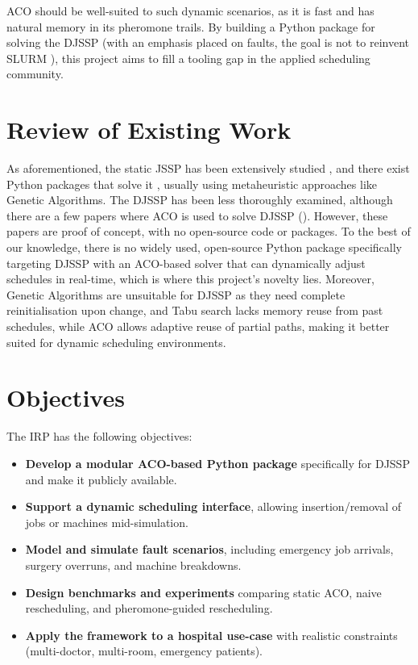 \documentclass[project-plan]{report-template}
\begin{document}
ACO should be well-suited to such dynamic scenarios, as it is fast and has natural memory in its pheromone trails. By building a Python package for solving the DJSSP (with an emphasis placed on faults, the goal is not to reinvent SLURM \cite{slurm}), this project aims to fill a tooling gap in the applied scheduling community.

\section{Review of Existing Work}
As aforementioned, the static JSSP has been extensively studied \cite{jssp}\cite{jssp-healthcare}\cite{jssp-manufacturing}, and there exist Python packages that solve it \cite{jobshoplib}, usually using metaheuristic approaches like Genetic Algorithms. The DJSSP has been less thoroughly examined, although there are a few papers where ACO is used to solve DJSSP (\cite{ELCOCK2023100280}\cite{acodjssp}). However, these papers are proof of concept, with no open-source code or packages.
To the best of our knowledge, there is no widely used, open-source Python package specifically targeting DJSSP with an ACO-based solver that can dynamically adjust schedules in real-time, which is where this project's novelty lies. Moreover, Genetic Algorithms are unsuitable for DJSSP as they need complete reinitialisation upon change, and Tabu search lacks memory reuse from past schedules, while ACO allows adaptive reuse of partial paths, making it better suited for dynamic scheduling environments.

\section{Objectives}
The IRP has the following objectives:
\begin{itemize}
    \item \textbf{Develop a modular ACO-based Python package} specifically for DJSSP and make it publicly available.
    \item \textbf{Support a dynamic scheduling interface}, allowing insertion/removal of jobs or machines mid-simulation.
    \item \textbf{Model and simulate fault scenarios}, including emergency job arrivals, surgery overruns, and machine breakdowns.
    \item \textbf{Design benchmarks and experiments} comparing static ACO, naive rescheduling, and pheromone-guided rescheduling.
    \item \textbf{Apply the framework to a hospital use-case} with realistic constraints (multi-doctor, multi-room, emergency patients).
\end{itemize}
\end{document}
